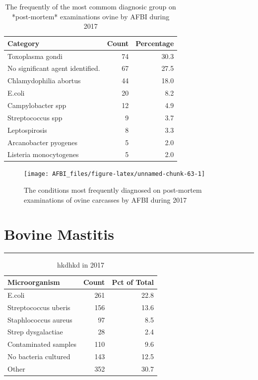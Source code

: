 \documentclass[]{book}
\begin{document}
\begin{table}

\caption{\label{tab:unnamed-chunk-62}The frequently of the most commom diagnosic group on *post-mortem* examinations ovine by AFBI during 2017}
\centering
\begin{tabular}[t]{l|r|r}
\hline
Category & Count & Percentage\\
\hline
Toxoplasma gondi & 74 & 30.3\\
\hline
No significant agent identified. & 67 & 27.5\\
\hline
Chlamydophilia abortus & 44 & 18.0\\
\hline
E.coli & 20 & 8.2\\
\hline
Campylobacter spp & 12 & 4.9\\
\hline
Streptococcus spp & 9 & 3.7\\
\hline
Leptospirosis & 8 & 3.3\\
\hline
Arcanobacter pyogenes & 5 & 2.0\\
\hline
Listeria monocytogenes & 5 & 2.0\\
\hline
\end{tabular}
\end{table}

\begin{figure}

{\centering \texttt{[image: AFBI\_files/figure-latex/unnamed-chunk-63-1]} 

}

\caption{The conditions most frequently diagnosed on post-mortem examinations of  ovine carcasses by AFBI during 2017}\label{fig:unnamed-chunk-63}
\end{figure}

\chapter{Bovine Mastitis}\label{bovine-mastitis}

\begin{center}\rule{0.5\linewidth}{\linethickness}\end{center}

\begin{table}

\caption{\label{tab:unnamed-chunk-67}hkdhkd in 2017}
\centering
\begin{tabular}[t]{l|r|r}
\hline
Microorganism & Count & Pct of Total\\
\hline
E.coli & 261 & 22.8\\
\hline
Streptococcus uberis & 156 & 13.6\\
\hline
Staphlococcus aureus & 97 & 8.5\\
\hline
Strep dysgalactiae & 28 & 2.4\\
\hline
Contaminated samples & 110 & 9.6\\
\hline
No bacteria cultured & 143 & 12.5\\
\hline
Other & 352 & 30.7\\
\hline
\end{tabular}
\end{table}
\end{document}
